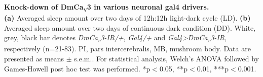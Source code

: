 \label{fig:S4}
\textbf{Knock-down of DmCa\textsubscript{v}3 in various neuronal gal4 drivers.}
\\
\textbf {(a)} Averaged sleep amount over two days of 12h:12h light-dark cycle (LD).
\textbf {(b)} Averaged sleep amount over two days of continuous dark condition (DD).
White, grey, black bar denotes \emph{DmCa\textsubscript{v}3-IR/+}, \emph{Gal4/+} and \emph{Gal4\textgreater{}DmCa\textsubscript{v}3-IR}, respectively (n=21-83).
PI, pars intercerebralis, MB, mushroom body. 
Data are presented as means $\pm$ s.e.m..
For statistical analysis, Welch's ANOVA followed by Games-Howell post hoc test was performed.
*p$<$0.05, **p$<$0.01, ***p$<$0.001.
  
  
  
  
  
  
  